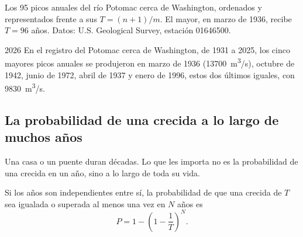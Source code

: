 \begin{omfigure}

{\small Los \num{95} picos anuales del río Potomac cerca de Washington,
ordenados y representados frente a sus  $T = (n+1)/m$. El
mayor, en marzo de 1936, recibe $T = 96$ años. Datos: U.S. Geological Survey,
estación 01646500.}
\end{omfigure}

\begin{dated}{2026}
En el registro del Potomac cerca de Washington, de 1931 a 2025, los cinco
mayores picos anuales se produjeron en marzo de 1936 (\qty{13700}{m^3/s}),
octubre de 1942, junio de 1972, abril de 1937 y enero de 1996, estos dos
últimos iguales, con \qty{9830}{m^3/s}.
\end{dated}

\subsection*{La probabilidad de una crecida a lo largo de muchos años}

Una casa o un puente duran décadas. Lo que les importa no es la probabilidad
de una crecida en un año, sino a lo largo de toda su vida.

\begin{proposition}\label{prop:g10:drainage-basins:chance}
Si los años son independientes entre sí, la probabilidad de que una crecida
de  $T$ sea igualada o superada al menos una vez en $N$
años es
\[
P = 1 - \left(1 - \frac{1}{T}\right)^{N}.
\]
\end{proposition}

